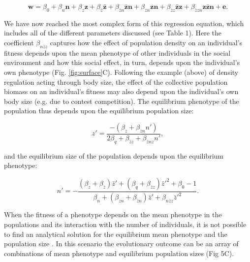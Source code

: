 \documentclass{article}
\begin{document}
\begin{equation} 
\mathbf{w}=\beta_{0} +\beta_{n} \mathbf{n} + \beta_{z} \mathbf{z}+ \beta_{\bar{z}} \mathbf{\bar{z}}  +   \beta_{\bar{z}n} \mathbf{\bar{z}n} +   \beta_{zn} \mathbf{zn} + \beta_{\bar{z}z} \mathbf{\bar{z}z}   +   \beta_{\bar{z}zn} \mathbf{z\bar{z}n} + \mathbf{e}.
\end{equation}

\noindent We have now reached the most complex form of this regression equation, which includes all of the different parameters discussed (see Table 1). Here the coefficient $\beta_{n\bar{z}z}$ captures how the effect of population density on an individual's fitness depends upon the mean phenotype of other individuals in the social environment and how this social effect, in turn, depends upon the individual's own phenotype (Fig. \ref{fig:surface}C). Following the example (above) of density regulation acting through body size, the effect of the collective population biomass on an individual's fitness may also depend upon the individual's own body size (e.g. due to contest competition). The equilibrium phenotype of the population thus depends upon the equilibrium population size: 

\begin{equation} 
z'=\frac{-(\beta_{z}+\beta_{zn}n')}{2\beta_{q} + \beta_{\bar{z}z} + \beta_{\bar{z}nz}n'},
\end{equation} 

\noindent and the equilibrium size of the population depends upon the equilibrium phenotype:

\begin{equation}  \label{eq: full}
	n' = -\frac{(\beta_{z}  +  \beta_{\bar{z}})\bar{z}' + (\beta_{q} + \beta_{\bar{z}z})\bar{z}'^2 +\beta_{0} -1}{\beta_{n} + (\beta_{zn} + \beta_{\bar{z}n}) \bar{z}' +  \beta_{n\bar{z}z}\bar{z}'^2}.
\end{equation}

When the fitness of a phenotype depends on the mean phenotype in the populations and its interaction with the number of individuals, it is not possible to find an analytical solution for the equilibrium mean phenotype and the population size \citep{Engen2020}. In this scenario the evolutionary outcome can be an array of combinations of mean phenotype and equilibrium population sizes (Fig 5C).
\end{document}
